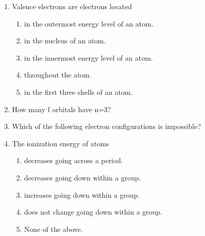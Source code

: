 \documentclass[main.tex]{subfiles}
\begin{document}
\begin{fullwidth}
\begin{multicols*}{2}
\begin{enumerate}
\item Valence electrons are electrons located
\begin{enumerate}[label=(\alph*)]\vspace{-0.5cm}
\item in the outermost energy level of an atom.
\item in the nucleus of an atom.
\item in the innermost energy level of an atom.
\item throughout the atom.
\item  in the first three shells of an atom.
\end{enumerate}\vspace{-0.5cm}

\item How many f orbitals have n=3?
\begin{enumerate}[label=(\alph*)]\vspace{-0.5cm}
\end{enumerate}\vspace{-0.5cm}

\item Which of the following electron configurations is impossible?
\begin{enumerate}[label=(\alph*)]\vspace{-0.5cm}
\end{enumerate}\vspace{-0.5cm}


\item The ionization energy of atoms
\begin{enumerate}[label=(\alph*)]\vspace{-0.5cm}
\item decreases going across a period.
\item decreases going down within a group.
\item increases going down within a group.
\item does not change going down within a group.
\item None of the above.
\end{enumerate}\vspace{-0.5cm}


\end{enumerate}
\end{multicols*}
\end{fullwidth}
\end{document}

